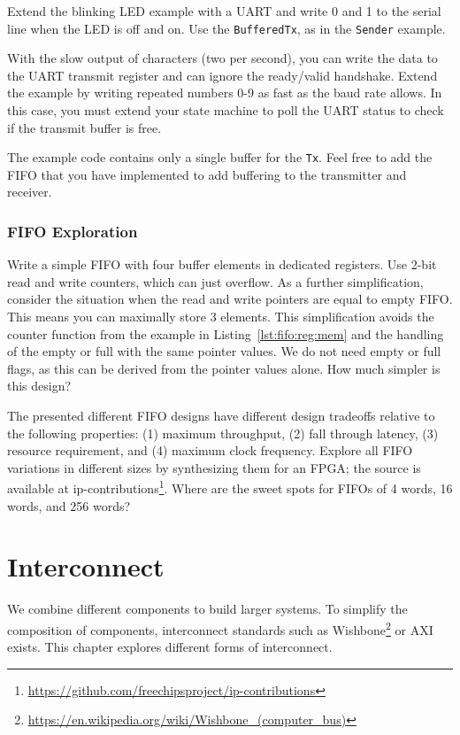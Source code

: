 \documentclass[%
    10pt,
    headinclude, footexclude,
    openright, %
    notitlepage,
    cleardoubleempty,
    headsepline,
    pointlessnumbers,
    bibtotoc, idxtotoc,
    ]{scrbook}
\newcommand{\code}[1]{{\lstinline[basicstyle=\small\ttfamily]{#1}}}
\newcommand{\myref}[2]{\href{#1}{#2}}
\renewcommand{\myref}[2]{{#2}{\footnote{\url{#1}}}}
\begin{document}
Extend the blinking LED example with a UART and write 0 and 1 to the serial
line when the LED is off and on. Use the \code{BufferedTx}, as in the \code{Sender}
example.

With the slow output of characters (two per second), you can write the data
to the UART transmit register and can ignore the ready/valid handshake.
Extend the example by writing repeated numbers 0-9 as fast as the baud rate allows.
In this case, you must extend your state machine to poll the UART status
to check if the transmit buffer is free.

The example code contains only a single buffer for the \code{Tx}. Feel free to
add the FIFO that you have implemented to add buffering to the transmitter
and receiver.

\subsection{FIFO Exploration}

Write a simple FIFO with four buffer elements in dedicated registers.
Use 2-bit read and write counters, which can just overflow.
As a further simplification, consider the situation when the read and write
pointers are equal to empty FIFO. This means you can maximally
store 3 elements. This simplification avoids the counter function from
the example in Listing~\ref{lst:fifo:reg:mem} and the handling
of the empty or full with the same pointer values. We do not need
empty or full flags, as this can be derived from the pointer values
alone. How much simpler is this design?

The presented different FIFO designs have different design tradeoffs
relative to the following properties: (1) maximum throughput,
(2) fall through latency, (3) resource requirement, and (4)
maximum clock frequency. Explore all FIFO variations in different sizes by
synthesizing them for an FPGA; the source is available at
\myref{https://github.com/freechipsproject/ip-contributions}{ip-contributions}.
Where are the sweet spots for FIFOs of 4 words, 16 words, and 256 words?

\chapter{Interconnect}
\label{chap:interconnect}

We combine different components to build larger systems.
To simplify the composition of components, interconnect standards such as
\myref{https://en.wikipedia.org/wiki/Wishbone_(computer_bus)}{Wishbone}
or AXI exists. This chapter explores different forms of interconnect.
\end{document}
